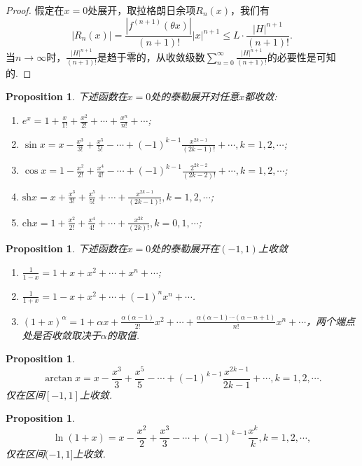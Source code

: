 \documentclass{article}
\newtheorem{proposition}[theorem]{Proposition}
\begin{document}
\begin{proof}
假定在$x=0$处展开，取拉格朗日余项$R_n(x)$，我们有
$$
|R_n(x)| = \frac{|f^{(n+1)}(\theta x)|}{(n+1)!}|x|^{n+1} \leq L \cdot \frac{|H|^{n+1}}{(n+1)!}.
$$
当$n \to \infty$时，$\frac{|H|^{n+1}}{(n+1)!}$是趋于零的，从收敛级数$\sum\limits_{n=0}^{\infty} \frac{|H|^{n+1}}{(n+1)!}$的必要性是可知的. 
\end{proof}


\begin{proposition}
\rm 下述函数在$x=0$处的泰勒展开对任意$x$都收敛:
\begin{enumerate}
	\item $e^x = 1 + \frac{x}{1!} + \frac{x^2}{2!} + \cdots + \frac{x^n}{n!} + \cdots$;
	\item $\sin x = {x} - \frac{x^3}{3!} + \frac{x^5}{5!} - \cdots + (-1)^{k-1}\frac{x^{2k-1}}{(2k-1)!} + \cdots,k =1,2,\cdots$;
	\item $\cos x = 1 - \frac{x^2}{2!} +  \frac{x^4}{4!} - \cdots + (-1)^{k-1}\frac{2^{2k-2}}{(2k-2)!} + \cdots , k=1,2,\cdots$;
	\item $\text{sh} x = x + \frac{x^3}{3!} + \frac{x^5}{5!}+ \cdots + \frac{x^{2k-1}}{(2k-1)!}, k = 1,2,\cdots$;
	\item $\text{ch} x = 1 + \frac{x^2}{2!} + \frac{x^4}{4!}+ \cdots + \frac{x^{2k}}{(2k)!}, k =0,1,\cdots$;
\end{enumerate}
\end{proposition}

\begin{proposition}
\rm 下述函数在$x=0$处的泰勒展开在$(-1,1)$上收敛
\begin{enumerate}
	\item $\frac{1}{1-x} = 1+x+x^2+\cdots+x^n + \cdots$;
	\item $\frac{1}{1+x} = 1-x+x^2+\cdots+(-1)^nx^n + \cdots$.
	\item $(1+x)^\alpha = 1 + \alpha x+ \frac{\alpha(\alpha-1)}{2!}x^2 +  \cdots + \frac{\alpha(\alpha-1)\cdots(\alpha-n+1)}{n!}x^n+\cdots$，两个端点处是否收敛取决于$\alpha$的取值. 
\end{enumerate}
\end{proposition}

\begin{proposition}
\rm 
$$
\arctan x = x - \frac{x^3}{3} + \frac{x^5}{5} - \cdots + (-1)^{k-1}\frac{x^{2k-1}}{2k-1} + \cdots,k=1,2,\cdots.
$$
仅在区间$[-1,1]$上收敛. 
\end{proposition}

\begin{proposition}
\rm 
$$
\ln (1+x) = x-\frac{x^2}{2} + \frac{x^3}{3}- \cdots + (-1)^{k-1}\frac{x^k}{k},k=1,2,\cdots,
$$
仅在区间$(-1,1]$上收敛. 
\end{proposition}
\end{document}
